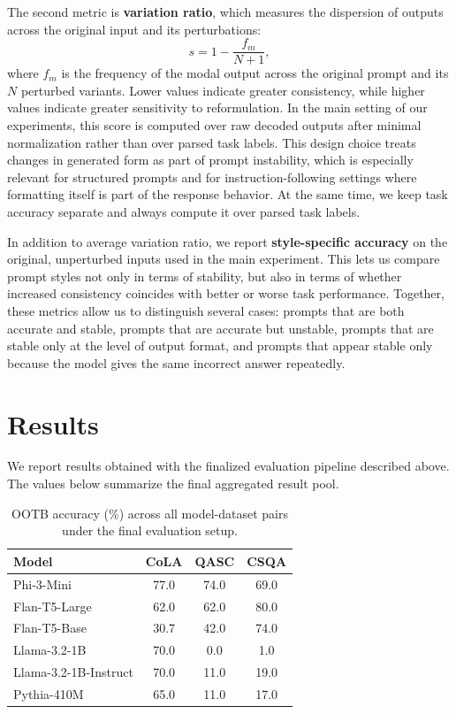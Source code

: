 \documentclass[11pt]{article}
\begin{document}
The second metric is \textbf{variation ratio}, which measures the dispersion of outputs across the original input and its perturbations:
\[
s = 1 - \frac{f_m}{N+1},
\]
where $f_m$ is the frequency of the modal output across the original prompt and its $N$ perturbed variants. Lower values indicate greater consistency, while higher values indicate greater sensitivity to reformulation. In the main setting of our experiments, this score is computed over raw decoded outputs after minimal normalization rather than over parsed task labels. This design choice treats changes in generated form as part of prompt instability, which is especially relevant for structured prompts and for instruction-following settings where formatting itself is part of the response behavior. At the same time, we keep task accuracy separate and always compute it over parsed task labels.

In addition to average variation ratio, we report \textbf{style-specific accuracy} on the original, unperturbed inputs used in the main experiment. This lets us compare prompt styles not only in terms of stability, but also in terms of whether increased consistency coincides with better or worse task performance. Together, these metrics allow us to distinguish several cases: prompts that are both accurate and stable, prompts that are accurate but unstable, prompts that are stable only at the level of output format, and prompts that appear stable only because the model gives the same incorrect answer repeatedly.

\section{Results}

We report results obtained with the finalized evaluation pipeline described above. The values below summarize the final aggregated result pool.

\begin{table}[t]
\centering
\small
\setlength{\tabcolsep}{4pt}
\begin{tabular}{lccc}
\toprule
Model & CoLA & QASC & CSQA \\
\midrule
Phi-3-Mini & 77.0 & 74.0 & 69.0 \\
Flan-T5-Large & 62.0 & 62.0 & 80.0 \\
Flan-T5-Base & 30.7 & 42.0 & 74.0 \\
Llama-3.2-1B & 70.0 & 0.0 & 1.0 \\
Llama-3.2-1B-Instruct & 70.0 & 11.0 & 19.0 \\
Pythia-410M & 65.0 & 11.0 & 17.0 \\
\bottomrule
\end{tabular}
\caption{OOTB accuracy (\%) across all model-dataset pairs under the final evaluation setup.}
\label{tab:ootb}
\end{table}
\end{document}
